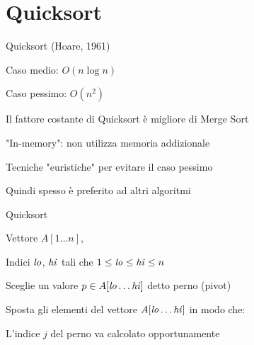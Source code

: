 \section{Quicksort}

\begin{frame}{Quicksort (Hoare, 1961)}
	
\vspace{-9pt}
\begin{myboxtitle}
\BI
\item Caso medio: $O(n \log n)$
\item Caso pessimo: $O(n^2)$
\EI
\end{myboxtitle}

\begin{myboxtitle}
\BI
\item Il fattore costante di Quicksort è migliore di Merge Sort
\item "In-memory": non utilizza memoria addizionale
\item Tecniche "euristiche" per evitare il caso pessimo
\item Quindi spesso è preferito ad altri algoritmi
\EI
\end{myboxtitle}

\end{frame}


\begin{frame}{Quicksort}

\vspace{-9pt}
\begin{myboxtitle}[Input]
\BI
\item Vettore $A[1 \ldots n]$, 
\item Indici $\mathit{lo}$, $\mathit{hi}$ tali che $1 \leq \mathit{lo} \leq \mathit{hi} \leq n$
\EI
\end{myboxtitle}

\begin{myboxtitle}[Divide]
\BIL
\item Sceglie un valore $p \in A[\mathit{lo} \ldots \mathit{hi}]$ 
  detto \alert{perno} (\alert{pivot})
\item Sposta gli elementi del vettore $A[\mathit{lo} \ldots \mathit{hi}]$ in modo che:



\item L'indice $j$ del perno va calcolato opportunamente
\EIL
\end{myboxtitle}

\end{frame}

